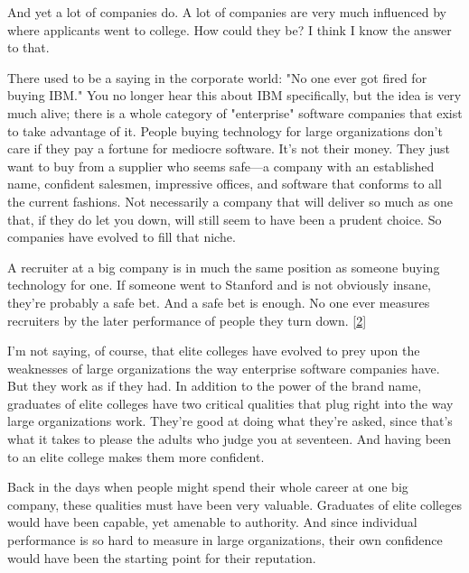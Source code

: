 And yet a lot of
                  companies do. A lot of companies are very much influenced by
                  where applicants went to college. How could they be? I think I
                  know the answer to that.

There used to be a saying
                  in the corporate world: "No one ever got fired for buying
                  IBM." You no longer hear this about IBM specifically, but the
                  idea is very much alive; there is a whole category of
                  "enterprise" software companies that exist to take advantage
                  of it. People buying technology for large organizations don't
                  care if they pay a fortune for mediocre software. It's not
                  their money. They just want to buy from a supplier who seems
                  safe---a company with an established name, confident
                  salesmen, impressive offices, and software that conforms to
                  all the current fashions. Not necessarily a company that will
                  deliver so much as one that, if they do let you down, will
                  still seem to have been a prudent choice. So companies have
                  evolved to fill that niche.

A recruiter at a big
                  company is in much the same position as someone buying
                  technology for one. If someone went to Stanford and is not
                  obviously insane, they're probably a safe bet. And a safe bet
                  is enough. No one ever measures recruiters by the later
                  performance of people they turn down.
                  [\href{\#f2n}{2}]

I'm not saying, of course, that elite colleges
                  have evolved to prey upon the weaknesses of large
                  organizations the way enterprise software companies have. But
                  they work as if they had. In addition to the power of the
                  brand name, graduates of elite colleges have two critical
                  qualities that plug right into the way large organizations
                  work. They're good at doing what they're asked, since that's
                  what it takes to please the adults who judge you at seventeen.
                  And having been to an elite college makes them more
                  confident.

Back in the days when people might spend
                  their whole career at one big company, these qualities must
                  have been very valuable. Graduates of elite colleges would
                  have been capable, yet amenable to authority. And since
                  individual performance is so hard to measure in large
                  organizations, their own confidence would have been the
                  starting point for their reputation.

